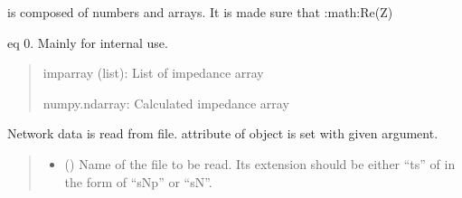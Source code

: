 \documentclass[letterpaper,10pt,english]{sphinxmanual}
\begin{document}
\begin{fulllineitems}

\begin{fulllineitems}
\label{\detokenize{touchstone:touchstone.spfile.prepare_ref_impedance_array}}
\pysigstartsignatures
{}
\pysigstopsignatures\begin{description}
\sphinxAtStartPar
is composed of numbers and arrays. It is made sure that :math:{\color{red}\bfseries{}\textasciigrave{}}Re(Z)

\end{description}

\sphinxAtStartPar
eq 0\textasciigrave{}. Mainly for internal use.
\begin{quote}
\begin{description}
\sphinxAtStartPar
imparray (list): List of impedance array

\sphinxAtStartPar
numpy.ndarray: Calculated impedance array

\end{description}
\end{quote}

\end{fulllineitems}


\begin{fulllineitems}
\label{\detokenize{touchstone:touchstone.spfile.read_file}}
\pysigstartsignatures
{}
\pysigstopsignatures
\sphinxAtStartPar
Network data is read from file.  attribute of object is set with given argument.
\begin{quote}\begin{description}
\begin{itemize}
\item {}
\sphinxAtStartPar
{} () \textendash{} Name of the file to be read. Its extension should be either “ts” of in the form of “sNp” or “sN”.


\end{itemize}
\end{description}
\end{quote}
\end{fulllineitems}
\end{fulllineitems}
\end{document}
